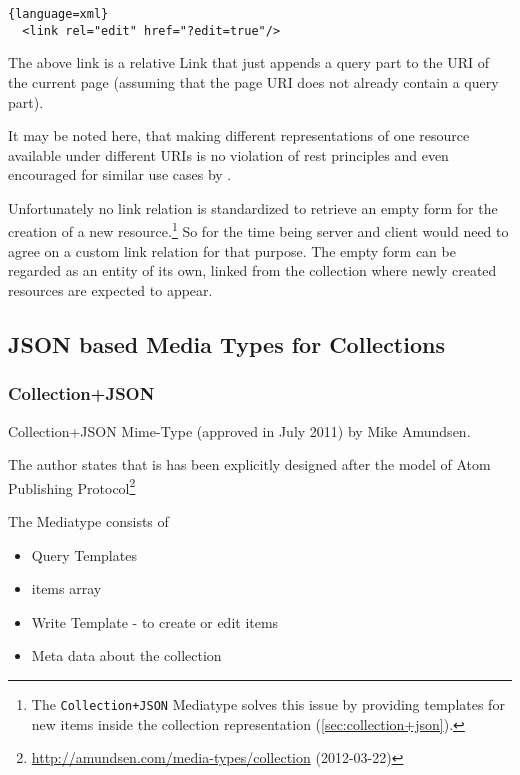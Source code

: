 \documentclass[12pt,a4paper,twoside]{scrartcl}		%
\newcommand{\citeurl}[2]{\url{#1} (#2)}
\begin{document}
\begin{lstlisting}{language=xml}
  <link rel="edit" href="?edit=true"/>
\end{lstlisting}

The above link is a relative Link that just appends a query part to the URI of
the current page (assuming that the page URI does not already contain a query
part).

It may be noted here, that making different representations of one resource
available under different URIs is no violation of rest principles and even
encouraged for similar use cases by \cite{Raman2006}.

Unfortunately no link relation is standardized to retrieve an empty form for the
creation of a new resource.\footnote{The \lstinline:Collection+JSON: Mediatype solves this issue by providing templates for new items inside the collection representation (\autoref{sec:collection+json}).}
 So for the time being server and client would need
to agree on a custom link relation for that purpose. The empty form can be
regarded as an entity of its own, linked from the collection where newly created
resources are expected to appear.

\subsection{JSON based Media Types for Collections}
\label{sec:media-types-coll}


\subsubsection{Collection+JSON}
\label{sec:collection+json}


Collection+JSON Mime-Type (approved in July 2011) by Mike Amundsen\cite{Amundsen2011a}\cite[ch. 3]{amundsen2011building}.

The author states that is has been explicitly designed after the model of Atom Publishing
Protocol\footnote{\citeurl{http://amundsen.com/media-types/collection}{2012-03-22}}

The Mediatype consists of

\begin{itemize}
\item Query Templates
\item items array
\item Write Template - to create or edit items
\item Meta data about the collection

\end{itemize}
\end{document}
